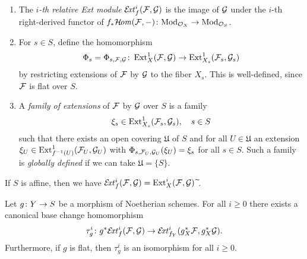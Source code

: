 \begin{definition}\begin{enumerate}
	\item The \emph{$i$-th relative Ext module} $\mathcal{E}\!\mathit{xt}^i_f(\mathcal{F},\mathcal{G})$ is the image of $\mathcal{G}$ under the $i$-th right-derived functor of
	$f_{*}\mathcal{H}\!\mathit{om}(\mathcal{F},-)
	\colon \mathrm{Mod}_{\mathcal{O}_X} \to \mathrm{Mod}_{\mathcal{O}_S}$.

	\item For $s\in S$, define the homomorphism
	\[
		\Phi_s = \Phi_{s,\mathcal{F},\mathcal{G}}
		\colon \operatorname{Ext}^1_X(\mathcal{F},\mathcal{G})
		\to \operatorname{Ext}^1_{X_s}(\mathcal{F}_s, \mathcal{G}_s)
	\]
	by restricting extensions of $\mathcal{F}$ by $\mathcal{G}$ to the fiber $X_s$. This is well-defined, since $\mathcal{F}$ is flat over $S$.

	\item A \emph{family of extensions} of $\mathcal{F}$ by $\mathcal{G}$ over $S$ is a family
	\[
		\xi_s \in \operatorname{Ext}^1_{X_s}(\mathcal{F}_s,\mathcal{G}_s),\quad s\in S
	\]
	such that there exists an open covering $\mathfrak{U}$ of $S$ and for all $U\in \mathfrak{U}$ an extension $\xi_U \in \operatorname{Ext}^1_{f^{-1}(U)}(\mathcal{F}_U,\mathcal{G}_U)$
	with $\Phi_{s,\mathcal{F}_U,\mathcal{G}_U}(\xi_U) = \xi_s$ for all $s\in S$.
	Such a family is \emph{globally defined} if we can take $\mathfrak{U} = \{S\}$.
\end{enumerate}
\end{definition}

\begin{remark}
	If $S$ is affine, then we have $\EXT^i_f(\mc{F},\mc{G})=\Ext^i_X(\mc{F},\mc{G}){\ \widetilde{}}$.
\end{remark}



\begin{proposition}
	Let $g \colon Y \to S$ be a morphism of Noetherian schemes.
	For all $i\geq 0$ there exists a canonical base change homomorphism
	\[
		\tau^i_{g} \colon g^{*}\mathcal{E}\!\mathit{xt}^i_{f}
		(\mathcal{F},\mathcal{G})
		\to
		\mathcal{E}\!\mathit{xt}^i_{f_Y}
		(g_X^{*}\mathcal{F}, g_X^{*}\mathcal{G}).
	\]
	Furthermore, if $g$ is flat, then $\tau^i_g$ is an isomorphism for all $i\geq 0$.
\end{proposition}

